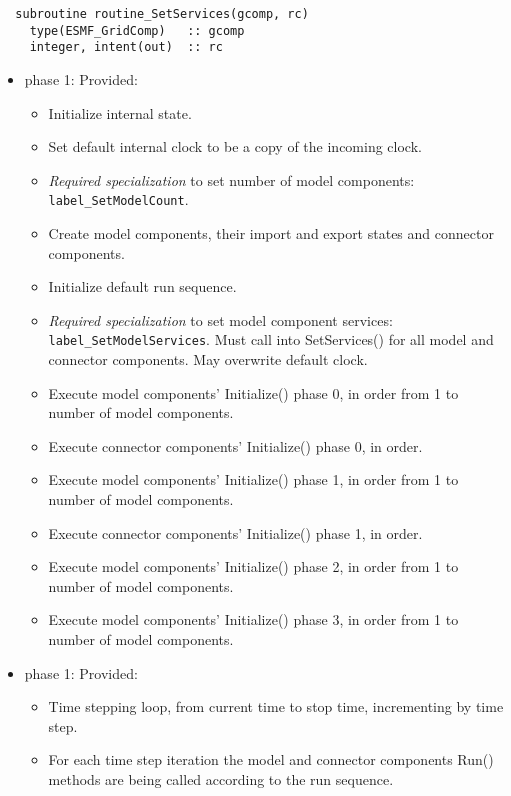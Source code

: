 \begin{verbatim}  subroutine routine_SetServices(gcomp, rc)
    type(ESMF_GridComp)   :: gcomp
    integer, intent(out)  :: rc
\end{verbatim}

\begin{itemize}
\item phase 1: {\sc Provided:}
  \begin{itemize}
  \item Initialize internal state.
  \item Set default internal clock to be a copy of the incoming clock.
  \item {\it Required specialization} to set number of model components: {\tt label\_SetModelCount}.
  \item Create model components, their import and export states and connector components.
  \item Initialize default run sequence.
  \item {\it Required specialization} to set model component services: {\tt label\_SetModelServices}. Must call into SetServices() for all model and connector components. May overwrite default clock.
  \item Execute model components' Initialize() phase 0, in order from 1 to number of model components.
  \item Execute connector components' Initialize() phase 0, in order.
  \item Execute model components' Initialize() phase 1, in order from 1 to number of model components.
  \item Execute connector components' Initialize() phase 1, in order.
  \item Execute model components' Initialize() phase 2, in order from 1 to number of model components.
  \item Execute model components' Initialize() phase 3, in order from 1 to number of model components.
  \end{itemize}  
\end{itemize}

\begin{itemize}
\item phase 1: {\sc Provided:}
  \begin{itemize}
  \item Time stepping loop, from current time to stop time, incrementing by time step.
  \item For each time step iteration the model and connector components Run() methods are being called according to the run sequence.
  \end{itemize}    
\end{itemize}

